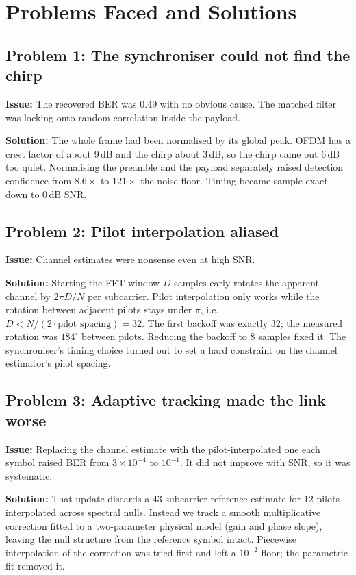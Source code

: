 \documentclass[11pt,a4paper]{report}
\begin{document}
\chapter{Problems Faced and Solutions}

\section{Problem 1: The synchroniser could not find the chirp}
\label{prob:chirp}
\textbf{Issue:} The recovered BER was 0.49 with no obvious cause. The matched filter
was locking onto random correlation inside the payload.

\textbf{Solution:} The whole frame had been normalised by its global peak. OFDM has
a crest factor of about 9\,dB and the chirp about 3\,dB, so the chirp came out 6\,dB
too quiet. Normalising the preamble and the payload separately raised detection
confidence from $8.6\times$ to $121\times$ the noise floor. Timing became
sample-exact down to 0\,dB SNR.

\section{Problem 2: Pilot interpolation aliased}
\label{prob:alias}
\textbf{Issue:} Channel estimates were nonsense even at high SNR.

\textbf{Solution:} Starting the FFT window $D$ samples early rotates the apparent
channel by $2\pi D/N$ per subcarrier. Pilot interpolation only works while the
rotation between adjacent pilots stays under $\pi$, i.e.\
$D<N/(2\cdot\text{pilot spacing})=32$. The first backoff was exactly 32; the measured
rotation was $184^\circ$ between pilots. Reducing the backoff to 8 samples fixed it.
The synchroniser's timing choice turned out to set a hard constraint on the channel
estimator's pilot spacing.

\section{Problem 3: Adaptive tracking made the link worse}
\label{prob:track}
\textbf{Issue:} Replacing the channel estimate with the pilot-interpolated one each
symbol raised BER from $3\times10^{-4}$ to $10^{-1}$. It did not improve with SNR,
so it was systematic.

\textbf{Solution:} That update discards a 43-subcarrier reference estimate for 12
pilots interpolated across spectral nulls. Instead we track a smooth multiplicative
correction fitted to a two-parameter physical model (gain and phase slope), leaving
the null structure from the reference symbol intact. Piecewise interpolation of the
correction was tried first and left a $10^{-2}$ floor; the parametric fit removed it.
\end{document}
